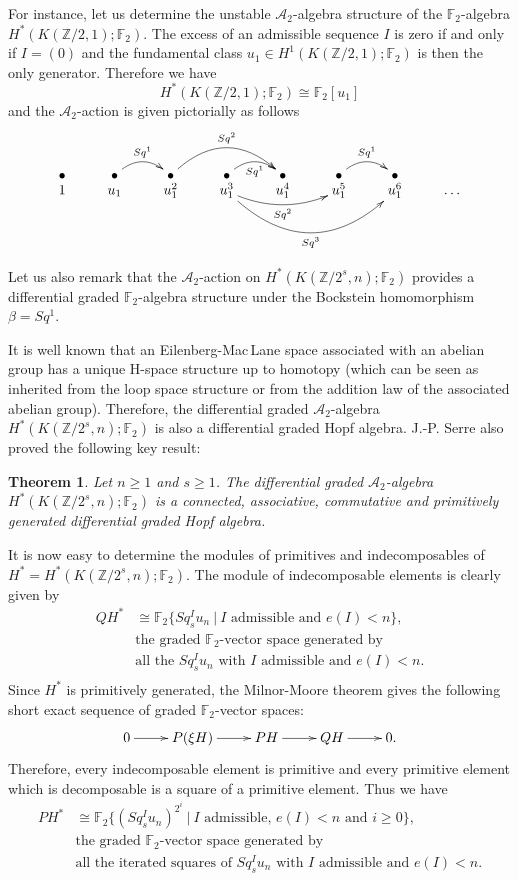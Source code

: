 \documentclass{amsart}
\newtheorem*{thm*}{Theorem}
\theoremstyle{definition}
\theoremstyle{remark}
\newcommand{\Z}{\mathbb{Z}}
\newcommand{\F}{\mathbb{F}}
\newcommand{\A}{\mathcal{A}}
\renewcommand{\geq}{\geqslant}
\begin{document}
For instance, let us determine the unstable $\A_2$-algebra structure of the $\F_2$-algebra $H^*(K(\Z/2,1);\F_2)$. The excess of an admissible sequence $I$ is zero if and only if $I=(0)$ and the fundamental class $u_1\in H^1(K(\Z/2,1);\F_2)$ is then the only generator. Therefore we have
$$
H^*(K(\Z/2,1);\F_2)\cong \F_2[u_1]
$$ and the $\A_2$-action is given pictorially as follows
$$\xymatrix@R=-0.1cm{
\bullet &\bullet\ar@/^10pt/[r]^-{Sq^1} &\bullet\ar@/^20pt/[rr]^-{Sq^2} &\bullet\ar@/^10pt/[r]_-{Sq^1} &\bullet &\bullet\ar@/^10pt/[r]^-{Sq^1} &\bullet \\
1 &u_1 &u_1^2 &u_1^3\ar@/_10pt/[rr]_-{Sq^2}\ar@/_30pt/[rrr]_-{Sq^3} &u_1^4 &u_1^5 &u_1^6 &\dots
}$$

Let us also remark that the $\A_2$-action on $H^*(K(\Z/2^s,n);\F_2)$ provides a differential graded $\F_2$-algebra structure under the Bockstein homomorphism $\beta=Sq^1$.

It is well known that an Eilenberg-Mac\,Lane space associated with an abelian group has a unique H-space structure up to homotopy (which can be seen as inherited from the loop space structure or from the addition law of the associated abelian group). Therefore, the differential graded $\A_2$-algebra $H^*(K(\Z/2^s,n);\F_2)$ is also a differential graded Hopf algebra. J.-P. Serre also proved the following key result:

\begin{thm*}
Let $n\geq1$ and $s\geq1$. The differential graded $\A_2$-algebra $H^*(K(\Z/2^s,n);\F_2)$ is a connected, associative, commutative and primitively generated differential graded Hopf algebra.
\end{thm*}


It is now easy to determine the modules of primitives and indecomposables of $H^*=H^*(K(\Z/2^s,n);\F_2)$. The module of indecomposable elements is clearly given by
\begin{align*}
QH^*&\cong\F_2\{Sq^I_s u_n\ |\ \text{$I$ admissible and $e(I)<n$}\},\\
&\text{the graded $\F_2$-vector space generated by}\\
&\text{all the $Sq^I_s u_n$ with $I$ admissible and $e(I)<n$.}\\
\end{align*}
Since $H^*$ is primitively generated, the Milnor-Moore theorem gives the following short exact sequence of graded $\F_2$-vector spaces:
$$\xymatrix{
0\ar[r] &P(\xi H)\ar[r] &PH\ar[r] &QH\ar[r] &0.
}$$ Therefore, every indecomposable element is primitive and every primitive element which is decomposable is a square of a primitive element. Thus we have
\begin{align*}
PH^*&\cong\F_2\{(Sq^I_s u_n)^{2^i}\ |\ \text{$I$ admissible, $e(I)<n$ and $i\geq0$}\},\\
&\text{the graded $\F_2$-vector space generated by}\\
&\text{all the iterated squares of $Sq^I_s u_n$ with $I$ admissible and $e(I)<n$.}\\
\end{align*}
\end{document}
